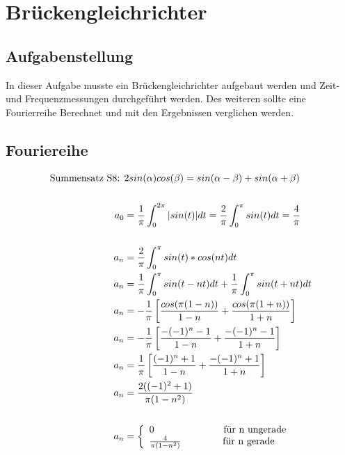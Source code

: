 \section{Br\"uckengleichrichter}
\subsection{Aufgabenstellung}
In dieser Aufgabe musste ein Br\"uckengleichrichter aufgebaut werden und Zeit- und Frequenzmessungen durchgef\"uhrt werden. Des weiteren sollte eine Fourierreihe Berechnet und mit den Ergebnissen verglichen werden.

\subsection{Fouriereihe}
\begin{center}
  \begin{align*}
    \text{Summensatz S8: } & 2sin(\alpha)cos(\beta) = sin(\alpha-\beta)+sin(\alpha+\beta) \\ \\
    a_0 &= \frac{1}{\pi}\int_0^{2\pi} |sin(t)| dt = \frac{2}{\pi}\int_0^{\pi} sin(t) dt = \frac{4}{\pi} \\ \\
    a_n &= \frac{2}{\pi}\int_0^{\pi} sin(t) * cos (nt) dt \\
    a_n &= \frac{1}{\pi}\int_0^{\pi} sin(t - nt) dt +  \frac{1}{\pi}\int_0^{\pi} sin(t + nt) dt\\
    a_n &= -\frac{1}{\pi} \left[ \frac{cos(\pi(1-n))}{1-n} + \frac{cos(\pi(1+n))}{1+n} \right] \\
    a_n &= -\frac{1}{\pi} \left[ \frac{-(-1)^n-1}{1-n} + \frac{-(-1)^n-1}{1+n} \right] \\
    a_n &= \frac{1}{\pi} \left[ \frac{(-1)^n+1}{1-n} + \frac{-(-1)^n+1}{1+n} \right] \\
    a_n &= \frac{2((-1)^2+1)}{\pi(1-n^2)} \\ \\
    a_n &= \left\{\begin{array}{ll}
            0                     \hspace{2.5cm} \text{f\"ur n ungerade}\\
            \frac{4}{\pi(1-n^2)} \hspace{1.5cm} \text{f\"ur n gerade}
            \end{array}\right.
  \end{align*}
\end{center}
